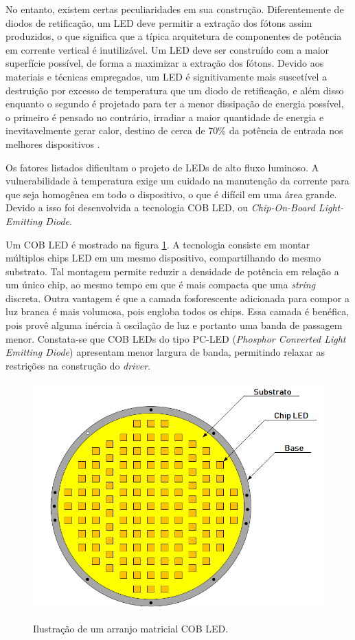 \documentclass[
        12pt,
        openany, %
        oneside, %
        a4paper,			
        english,			
        brazil
        ]{abntbibufjf}
\begin{document}
No entanto, existem certas peculiaridades em sua construção. Diferentemente de diodos de retificação, um LED deve permitir a extração dos fótons assim produzidos, o que significa que a típica arquitetura de componentes de potência em corrente vertical é inutilizável. Um LED deve ser construído com a maior superfície possível, de forma a maximizar a extração dos fótons. Devido aos materiais e técnicas empregados, um LED é signitivamente mais suscetível a destruição por excesso de temperatura que um diodo de retificação, e além disso enquanto o segundo é projetado para ter a menor dissipação de energia possível, o primeiro é pensado no contrário, irradiar a maior quantidade de energia e inevitavelmente gerar calor, destino de cerca de 70\% da potência de entrada nos melhores dispositivos \cite{liu}.

Os fatores listados dificultam o projeto de LEDs de alto fluxo luminoso. A vulnerabilidade à temperatura exige um cuidado na manutenção da corrente para que seja homogênea em todo o dispositivo, o que é difícil em uma área grande. Devido a isso foi desenvolvida a tecnologia COB LED, ou \textit{Chip-On-Board Light-Emitting Diode}.

Um COB LED é mostrado na figura \ref{cob}. A tecnologia consiste em montar múltiplos chips LED em um mesmo dispositivo, compartilhando do mesmo substrato. Tal montagem permite reduzir a densidade de potência em relação a um único chip, ao mesmo tempo em que é mais compacta que uma \textit{string} discreta. Outra vantagem é que a camada fosforescente adicionada para compor a luz branca é mais volumosa, pois engloba todos os chips. Essa camada é benéfica, pois provê alguma inércia à oscilação de luz e portanto uma banda de passagem menor. Constata-se que COB LEDs do tipo PC-LED (\textit{Phosphor Converted Light Emitting Diode}) apresentam menor largura de banda, permitindo relaxar as restrições na construção do \textit{driver}.

\begin{figure}[h]
	\centering
	\caption{Ilustração de um arranjo matricial COB LED.}
	\includegraphics[scale=.4]{../FIGURAS/cob.png}\\
	\label{cob}
\end{figure}
\end{document}
